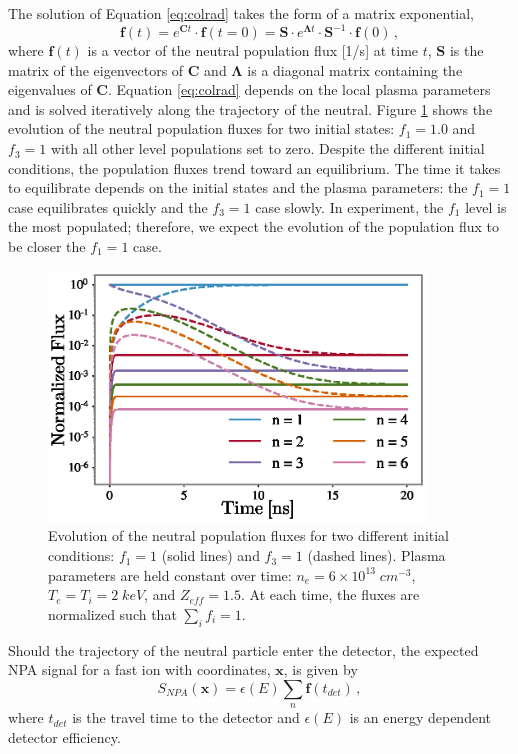 The solution of Equation \ref{eq:colrad} takes the form of a matrix exponential,
\begin{equation} \label{eq:neutral_flux}
    \mathbf{f}(t) = e^{\mathbf{C} t} \cdot \mathbf{f}(t=0) = \mathbf{S} \cdot e^{\mathbf{\Lambda} t} \cdot \mathbf{S}^{-1} \cdot \mathbf{f}(0)\,,
\end{equation}
where $\mathbf{f}(t)$ is a vector of the neutral population flux [1/s] at time $t$, $\mathbf{S}$ is the matrix of the eigenvectors of $\mathbf{C}$ and $\mathbf{\Lambda}$ is a diagonal matrix containing the eigenvalues of $\mathbf{C}$.
Equation \ref{eq:colrad} depends on the local plasma parameters and is solved iteratively along the trajectory of the neutral. Figure \ref{fig:f_evolution} shows the evolution of the neutral population fluxes for two initial states: $f_1 = 1.0$ and $f_3=1$ with all other level populations set to zero. Despite the different initial conditions, the population fluxes trend toward an equilibrium. The time it takes to equilibrate depends on the initial states and the plasma parameters: the $f_1=1$ case equilibrates quickly and the $f_3=1$ case slowly. In experiment, the $f_1$ level is the most populated; therefore, we expect the evolution of the population flux to be closer the $f_1=1$ case.
\begin{figure}[ht]
    \centering
    \includegraphics[width=10cm]{figures/f_evolution.eps}
    \caption{Evolution of the neutral population fluxes for two different initial conditions: $f_1=1$ (solid lines) and $f_3=1$ (dashed lines). Plasma parameters are held constant over time: $n_e = 6\times10^{13}\;cm^{-3}$, $T_e=T_i = 2\;keV$, and $Z_{eff} = 1.5$. At each time, the fluxes are normalized such that $\sum_i f_i = 1$.}
    \label{fig:f_evolution}
\end{figure}

Should the trajectory of the neutral particle enter the detector, the expected NPA signal for a fast ion with coordinates, $\mathbf{x}$, is given by
\begin{equation}\label{eq:npa_weight}
    S_{NPA}(\mathbf{x}) = \epsilon(E) \sum_n \mathbf{f}(t_{det})\,,
\end{equation}
where $t_{det}$ is the travel time to the detector and $\epsilon(E)$ is an energy dependent detector efficiency.

